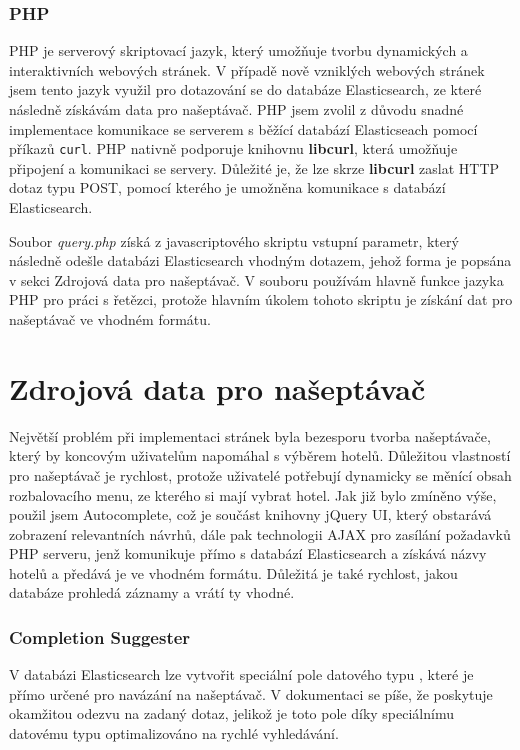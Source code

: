\documentclass[czech,BP]{thesiskiv}
\begin{document}
\subsubsection{PHP}
PHP je serverový skriptovací jazyk, který umožňuje tvorbu dynamických a interaktivních webových stránek.\cite{PHP} V případě nově vzniklých webových stránek jsem tento jazyk využil pro dotazování se do databáze Elasticsearch, ze které následně získávám data pro našeptávač. PHP jsem zvolil z důvodu snadné implementace komunikace se serverem s běžící databází Elasticseach pomocí příkazů \texttt{curl}. PHP nativně podporuje knihovnu \textbf{libcurl}, která umožňuje připojení a komunikaci se servery.\cite{PHP_libcurl} Důležité je, že lze skrze \textbf{libcurl} zaslat HTTP dotaz typu POST, pomocí kterého je umožněna komunikace s databází Elasticsearch.


Soubor \textit{query.php} získá z javascriptového skriptu vstupní parametr, který následně odešle databázi Elasticsearch vhodným dotazem, jehož forma je popsána v sekci Zdrojová data pro našeptávač. V souboru používám hlavně funkce jazyka PHP pro  práci s řetězci, protože hlavním úkolem tohoto skriptu je získání dat pro našeptávač ve vhodném formátu.

\section{Zdrojová data pro našeptávač}
Největší problém při implementaci stránek byla bezesporu tvorba našeptávače, který by koncovým uživatelům napomáhal s výběrem hotelů. Důležitou vlastností pro našeptávač je rychlost, protože uživatelé potřebují dynamicky se měnící obsah rozbalovacího menu, ze kterého si mají vybrat hotel. Jak již bylo zmíněno výše, použil jsem Autocomplete, což je součást knihovny jQuery UI, který obstarává zobrazení relevantních návrhů, dále pak technologii AJAX pro zasílání požadavků PHP serveru, jenž komunikuje přímo s databází Elasticsearch a získává názvy hotelů a předává je ve vhodném formátu. Důležitá je také rychlost, jakou databáze prohledá záznamy a vrátí ty vhodné.

\subsubsection{Completion Suggester}
V databázi Elasticsearch lze vytvořit speciální pole datového typu , které je přímo určené pro navázání na našeptávač. V dokumentaci se píše, že poskytuje okamžitou odezvu na zadaný dotaz, jelikož je toto pole díky speciálnímu datovému typu optimalizováno na rychlé vyhledávání.\cite{Completion_suggester}
\end{document}
